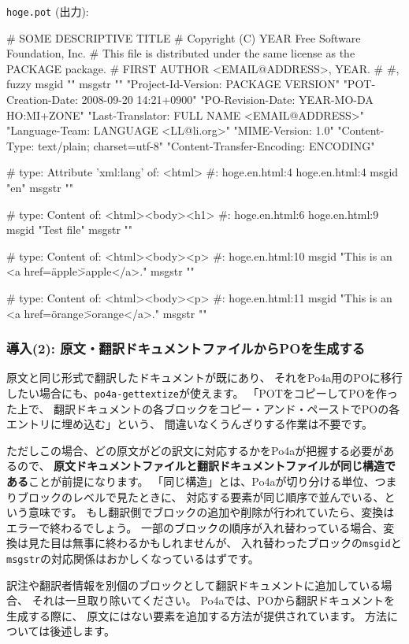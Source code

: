 \documentclass[mingoth,a4paper]{jsarticle}
\begin{document}
\texttt{hoge.pot} (出力):

\begin{commandline}
# SOME DESCRIPTIVE TITLE
# Copyright (C) YEAR Free Software Foundation, Inc.
# This file is distributed under the same license as the PACKAGE package.
# FIRST AUTHOR <EMAIL@ADDRESS>, YEAR.
#
#, fuzzy
msgid ""
msgstr ""
"Project-Id-Version: PACKAGE VERSION\n"
"POT-Creation-Date: 2008-09-20 14:21+0900\n"
"PO-Revision-Date: YEAR-MO-DA HO:MI+ZONE\n"
"Last-Translator: FULL NAME <EMAIL@ADDRESS>\n"
"Language-Team: LANGUAGE <LL@li.org>\n"
"MIME-Version: 1.0\n"
"Content-Type: text/plain; charset=utf-8\n"
"Content-Transfer-Encoding: ENCODING"

# type: Attribute 'xml:lang' of: <html>
#: hoge.en.html:4 hoge.en.html:4
msgid "en"
msgstr ""

# type: Content of: <html><body><h1>
#: hoge.en.html:6 hoge.en.html:9
msgid "Test file"
msgstr ""

# type: Content of: <html><body><p>
#: hoge.en.html:10
msgid "This is an <a href=\"apple\">apple</a>."
msgstr ""

# type: Content of: <html><body><p>
#: hoge.en.html:11
msgid "This is an <a href=\"orange\">orange</a>."
msgstr ""
\end{commandline}

\subsubsection{導入(2): 原文・翻訳ドキュメントファイルからPOを生成する}

原文と同じ形式で翻訳したドキュメントが既にあり、
それをPo4a用のPOに移行したい場合にも、\texttt{po4a-gettextize}が使えます。
「POTをコピーしてPOを作った上で、
翻訳ドキュメントの各ブロックをコピー・アンド・ペーストでPOの各エントリに埋め込む」という、
間違いなくうんざりする作業は不要です。

ただしこの場合、どの原文がどの訳文に対応するかをPo4aが把握する必要があるので、
{\bf 原文ドキュメントファイルと翻訳ドキュメントファイルが同じ構造である}ことが前提になります。
「同じ構造」とは、Po4aが切り分ける単位、つまりブロックのレベルで見たときに、
対応する要素が同じ順序で並んでいる、という意味です。
もし翻訳側でブロックの追加や削除が行われていたら、変換はエラーで終わるでしょう。
一部のブロックの順序が入れ替わっている場合、変換は見た目は無事に終わるかもしれませんが、
入れ替わったブロックの\texttt{msgid}と\texttt{msgstr}の対応関係はおかしくなっているはずです。

訳注や翻訳者情報を別個のブロックとして翻訳ドキュメントに追加している場合、
それは一旦取り除いてください。
Po4aでは、POから翻訳ドキュメントを生成する際に、
原文にはない要素を追加する方法が提供されています。
方法については後述します。
\end{document}
